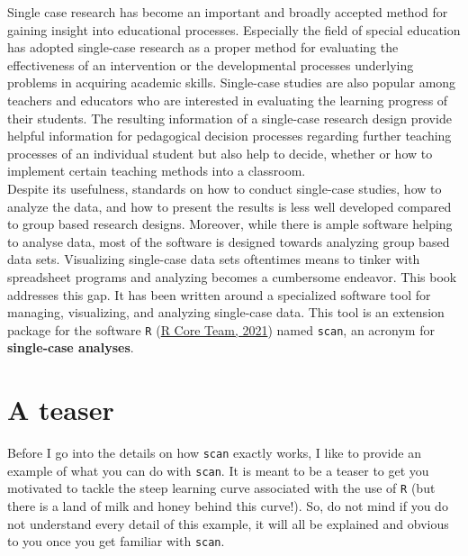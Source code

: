 \documentclass[
]{book}
\begin{document}
Single case research has become an important and broadly accepted method for gaining insight into educational processes. Especially the field of special education has adopted single-case research as a proper method for evaluating the effectiveness of an intervention or the developmental processes underlying problems in acquiring academic skills. Single-case studies are also popular among teachers and educators who are interested in evaluating the learning progress of their students. The resulting information of a single-case research design provide helpful information for pedagogical decision processes regarding further teaching processes of an individual student but also help to decide, whether or how to implement certain teaching methods into a classroom.\\
Despite its usefulness, standards on how to conduct single-case studies, how to analyze the data, and how to present the results is less well developed compared to group based research designs. Moreover, while there is ample software helping to analyse data, most of the software is designed towards analyzing group based data sets. Visualizing single-case data sets oftentimes means to tinker with spreadsheet programs and analyzing becomes a cumbersome endeavor. This book addresses this gap. It has been written around a specialized software tool for managing, visualizing, and analyzing single-case data. This tool is an extension package for the software \texttt{R} (\protect\hyperlink{ref-R-base}{R Core Team, 2021}) named \texttt{scan}, an acronym for \textbf{single-case analyses}.

\hypertarget{a-teaser}{%
\section{A teaser}\label{a-teaser}}

Before I go into the details on how \texttt{scan} exactly works, I like to provide an example of what you can do with \texttt{scan}. It is meant to be a teaser to get you motivated to tackle the steep learning curve associated with the use of \texttt{R} (but there is a land of milk and honey behind this curve!). So, do not mind if you do not understand every detail of this example, it will all be explained and obvious to you once you get familiar with \texttt{scan}.
\end{document}
